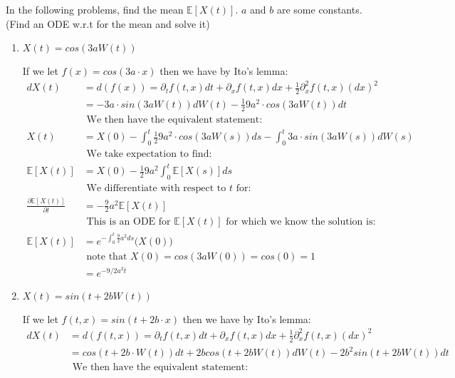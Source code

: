 \documentclass[12pt,twoside, letter]{exam}
\theoremstyle{definition}
\newcommand{\ee}{\mathbb{E}}
\begin{document}
\par{ In the following problems, find the mean $\ee[X(t)]$. $a$ and $b$ are some constants. \\
(Find an ODE w.r.t for the mean and solve it)}

\begin{enumerate}
  \item $X(t) = cos(3aW(t))$
    \begin{solution}
      If we let $f(x) = cos(3a\cdot x)$ then we have by Ito's lemma:
      \begin{align*}
        dX(t) &= d(f(x)) = \partial_t f(t,x)dt + \partial_x f(t,x)dx + \frac{1}{2} \partial^2_x f(t,x) (dx)^2 \\
        &= -3a\cdot sin(3aW(t)) dW(t) - \frac{1}{2} 9a^2 \cdot cos(3aW(t)) dt \\
        &\text{ We then have the equivalent statement: } \\
        X(t) &= X(0) - \int^t_0 \frac{1}{2} 9a^2 \cdot cos(3aW(s)) ds - \int^t_0 3a\cdot sin(3aW(s)) dW(s) \\
        &\text{ We take expectation to find: } \\
        \ee[X(t)] &= X(0) - \frac{1}{2} 9a^2 \int^t_0 \ee[X(s)] ds \\
        &\text{ We differentiate with respect to $t$ for: } \\
        \frac{\partial \ee[X(t)]}{\partial t} &= -\frac{9}{2}a^2 \ee[X(t)] \\
        &\text{ This is an ODE for $\ee[X(t)]$ for which we know the solution is:} \\
        \ee[X(t)] &= e^{-\int^t_0 \frac{9}{2}a^2 ds}\bigg( X(0) \bigg) \\
        &\text{ note that $X(0) = cos(3aW(0)) = cos(0) = 1$} \\
        &= e^{-9/2a^2t}
      \end{align*}
    \end{solution}
  \item $X(t) = sin(t + 2bW(t))$
    \begin{solution}
      If we let $f(t,x) = sin(t + 2b\cdot x)$ then we have by Ito's lemma:
      \begin{align*}
        dX(t) &= d(f(t,x)) = \partial_t f(t,x)dt + \partial_x f(t,x)dx + \frac{1}{2} \partial^2_x f(t,x) (dx)^2 \\
        &= cos(t + 2b \cdot W(t))dt + 2b cos(t + 2bW(t))dW(t) - 2b^2 sin(t + 2bW(t)) dt \\
        &\text{ We then have the equivalent statement: } \\

\end{align*}
\end{solution}
\end{enumerate}
\end{document}
